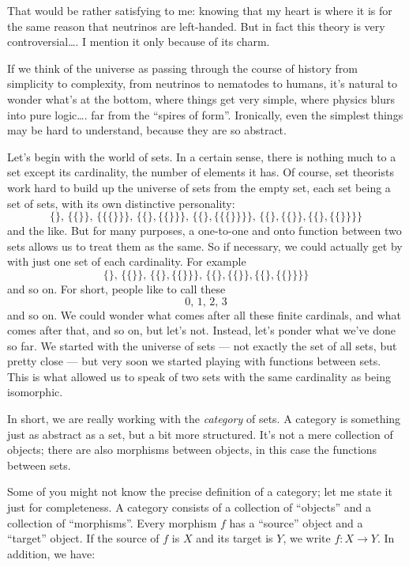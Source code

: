 \documentclass{article}
\begin{document}
That would be rather satisfying to me: knowing that my heart is where it
is for the same reason that neutrinos are left-handed. But in fact this
theory is very controversial\ldots. I mention it only because of its
charm.

If we think of the universe as passing through the course of history
from simplicity to complexity, from neutrinos to nematodes to humans,
it's natural to wonder what's at the bottom, where things get very
simple, where physics blurs into pure logic\ldots. far from the ``spires
of form''. Ironically, even the simplest things may be hard to
understand, because they are so abstract.

Let's begin with the world of sets. In a certain sense, there is nothing
much to a set except its cardinality, the number of elements it has. Of
course, set theorists work hard to build up the universe of sets from
the empty set, each set being a set of sets, with its own distinctive
personality:
\[\{\} ,\, \{\{\}\} ,\, \{\{\{\}\}\} ,\, \{\{\},\{\{\}\}\} ,\, \{\{\},\{\{\{\}\}\}\} ,\, \{\{\},\{\{\}\},\{\{\},\{\{\}\}\}\}\]
and the like. But for many purposes, a one-to-one and onto function
between two sets allows us to treat them as the same. So if necessary,
we could actually get by with just one set of each cardinality. For
example
\[\{\} ,\, \{\{\}\} ,\, \{\{\},\{\{\}\}\} ,\, \{\{\},\{\{\}\},\{\{\},\{\{\}\}\}\}\]
and so on. For short, people like to call these \[0 ,\, 1 ,\, 2 ,\, 3\]
and so on. We could wonder what comes after all these finite cardinals,
and what comes after that, and so on, but let's not. Instead, let's
ponder what we've done so far. We started with the universe of sets ---
not exactly the set of all sets, but pretty close --- but very soon we
started playing with functions between sets. This is what allowed us to
speak of two sets with the same cardinality as being isomorphic.

In short, we are really working with the \emph{category} of sets. A
category is something just as abstract as a set, but a bit more
structured. It's not a mere collection of objects; there are also
morphisms between objects, in this case the functions between sets.

Some of you might not know the precise definition of a category; let me
state it just for completeness. A category consists of a collection of
``objects'' and a collection of ``morphisms''. Every morphism \(f\) has
a ``source'' object and a ``target'' object. If the source of \(f\) is
\(X\) and its target is \(Y\), we write \(f\colon X \to Y\). In
addition, we have:
\end{document}
